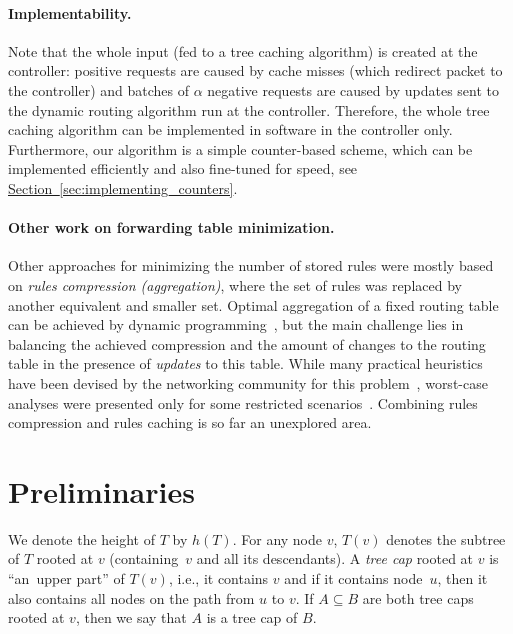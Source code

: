 \documentclass[sigconf,screen=true]{acmart}
\newcommand{\lref}[2][]{\hyperref[#2]{#1~\ref*{#2}}}
\begin{document}
\paragraph{Implementability.}

Note that the whole input (fed to a tree caching algorithm) is created at the
controller: positive requests are caused by cache misses (which redirect
packet to the controller) and batches of $\alpha$ negative requests are caused
by updates sent to the dynamic routing algorithm run at the controller.
Therefore, the whole tree caching algorithm can be implemented in software
in the controller only. Furthermore, our algorithm is a simple counter-based
scheme, which can be implemented efficiently and also fine-tuned for speed,
see \lref[Section]{sec:implementing_counters}.

\paragraph{Other work on forwarding table minimization.}

Other approaches for minimizing the number of stored rules were mostly based
on \emph{rules compression (aggregation)}, where the set of rules was replaced
by another equivalent and smaller set. Optimal aggregation of a fixed routing
table can be achieved by dynamic
programming~\cite{ortc,fib-compression-two-dimensional}, but the main
challenge lies in balancing the achieved compression and the amount of changes
to the routing table in the presence of \emph{updates} to this table. While
many practical heuristics have been devised by the networking community for
this problem~\cite{mms,fib-compression-fifa,fib-compression-globecom10,fib-compression-infocom13,fib-sigcomm,fib-compression-smalta,fib-compression-infocom10},
worst-case analyses were presented only for some restricted
scenarios~\cite{fib-icdcs,fib-sirocco}. Combining rules compression and rules
caching is so far an unexplored area.


\section{Preliminaries}\label{sec:preliminaries}

We denote the height of $T$ by $h(T)$. For any node $v$, $T(v)$ denotes the
subtree of $T$ rooted at $v$ (containing~$v$ and all its descendants). A
\emph{tree cap} rooted at $v$ is ``an~upper part'' of $T(v)$, i.e., it
contains $v$ and if it contains node~$u$, then it also contains all nodes on
the path from $u$ to $v$. If $A \subseteq B$ are both tree caps rooted at $v$,
then we say that $A$ is a tree cap of $B$.
\end{document}
